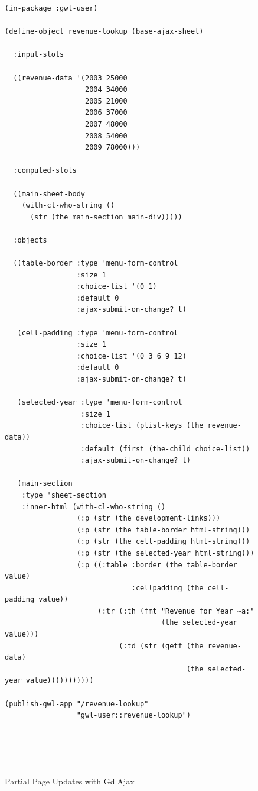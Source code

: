 \documentclass [11pt]{book}
\begin{document}
\begin{figure}
\begin{lrbox}{\boxedverb}
\begin{minipage}{\linewidth}
{\small

\begin{verbatim}(in-package :gwl-user)

(define-object revenue-lookup (base-ajax-sheet)
  
  :input-slots
  
  ((revenue-data '(2003 25000
                   2004 34000
                   2005 21000
                   2006 37000
                   2007 48000
                   2008 54000
                   2009 78000)))
  
  :computed-slots
  
  ((main-sheet-body 
    (with-cl-who-string ()
      (str (the main-section main-div)))))
  
  :objects
  
  ((table-border :type 'menu-form-control
                 :size 1
                 :choice-list '(0 1)
                 :default 0
                 :ajax-submit-on-change? t)
   
   (cell-padding :type 'menu-form-control
                 :size 1
                 :choice-list '(0 3 6 9 12)
                 :default 0
                 :ajax-submit-on-change? t)
   
   (selected-year :type 'menu-form-control
                  :size 1
                  :choice-list (plist-keys (the revenue-data))
                  :default (first (the-child choice-list))
                  :ajax-submit-on-change? t)
   
   (main-section 
    :type 'sheet-section
    :inner-html (with-cl-who-string ()
                 (:p (str (the development-links)))
                 (:p (str (the table-border html-string)))
                 (:p (str (the cell-padding html-string)))
                 (:p (str (the selected-year html-string)))
                 (:p ((:table :border (the table-border value)
                              :cellpadding (the cell-padding value))
                      (:tr (:th (fmt "Revenue for Year ~a:" 
                                     (the selected-year value)))
                           (:td (str (getf (the revenue-data) 
                                           (the selected-year value)))))))))))

(publish-gwl-app "/revenue-lookup" 
                 "gwl-user::revenue-lookup")





\end{verbatim}}
\end{minipage}
\end{lrbox}
\fbox{\usebox{\boxedverb}}

\caption{Partial Page Updates with GdlAjax}

\label{fig:gwl-4}

\end{figure}
\end{document}
